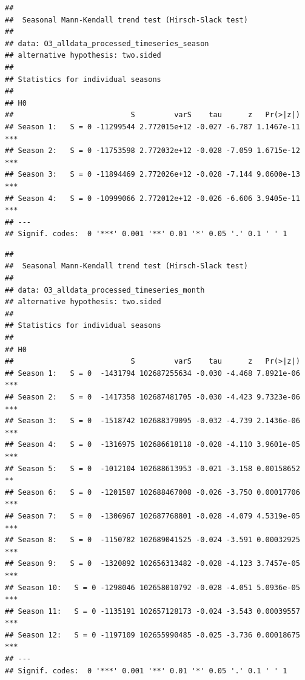 \documentclass[12pt,]{article}
\newenvironment{Shaded}{\begin{snugshade}}{\end{snugshade}}
\newcommand{\KeywordTok}[1]{\textcolor[rgb]{0.13,0.29,0.53}{\textbf{#1}}}
\newcommand{\DataTypeTok}[1]{\textcolor[rgb]{0.13,0.29,0.53}{#1}}
\newcommand{\DecValTok}[1]{\textcolor[rgb]{0.00,0.00,0.81}{#1}}
\newcommand{\StringTok}[1]{\textcolor[rgb]{0.31,0.60,0.02}{#1}}
\newcommand{\OperatorTok}[1]{\textcolor[rgb]{0.81,0.36,0.00}{\textbf{#1}}}
\newcommand{\NormalTok}[1]{#1}
\begin{document}
\begin{verbatim}
## 
##  Seasonal Mann-Kendall trend test (Hirsch-Slack test)
## 
## data: O3_alldata_processed_timeseries_season
## alternative hypothesis: two.sided
## 
## Statistics for individual seasons
## 
## H0
##                           S         varS    tau      z   Pr(>|z|)    
## Season 1:   S = 0 -11299544 2.772015e+12 -0.027 -6.787 1.1467e-11 ***
## Season 2:   S = 0 -11753598 2.772032e+12 -0.028 -7.059 1.6715e-12 ***
## Season 3:   S = 0 -11894469 2.772026e+12 -0.028 -7.144 9.0600e-13 ***
## Season 4:   S = 0 -10999066 2.772012e+12 -0.026 -6.606 3.9405e-11 ***
## ---
## Signif. codes:  0 '***' 0.001 '**' 0.01 '*' 0.05 '.' 0.1 ' ' 1
\end{verbatim}

\begin{Shaded}
\end{Shaded}

\begin{verbatim}
## 
##  Seasonal Mann-Kendall trend test (Hirsch-Slack test)
## 
## data: O3_alldata_processed_timeseries_month
## alternative hypothesis: two.sided
## 
## Statistics for individual seasons
## 
## H0
##                           S         varS    tau      z   Pr(>|z|)    
## Season 1:   S = 0  -1431794 102687255634 -0.030 -4.468 7.8921e-06 ***
## Season 2:   S = 0  -1417358 102687481705 -0.030 -4.423 9.7323e-06 ***
## Season 3:   S = 0  -1518742 102688379095 -0.032 -4.739 2.1436e-06 ***
## Season 4:   S = 0  -1316975 102686618118 -0.028 -4.110 3.9601e-05 ***
## Season 5:   S = 0  -1012104 102688613953 -0.021 -3.158 0.00158652  **
## Season 6:   S = 0  -1201587 102688467008 -0.026 -3.750 0.00017706 ***
## Season 7:   S = 0  -1306967 102687768801 -0.028 -4.079 4.5319e-05 ***
## Season 8:   S = 0  -1150782 102689041525 -0.024 -3.591 0.00032925 ***
## Season 9:   S = 0  -1320892 102656313482 -0.028 -4.123 3.7457e-05 ***
## Season 10:   S = 0 -1298046 102658010792 -0.028 -4.051 5.0936e-05 ***
## Season 11:   S = 0 -1135191 102657128173 -0.024 -3.543 0.00039557 ***
## Season 12:   S = 0 -1197109 102655990485 -0.025 -3.736 0.00018675 ***
## ---
## Signif. codes:  0 '***' 0.001 '**' 0.01 '*' 0.05 '.' 0.1 ' ' 1
\end{verbatim}
\end{document}

